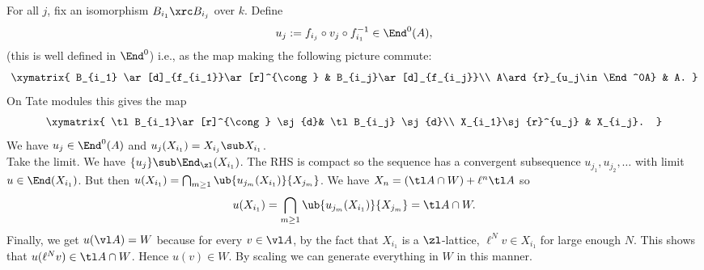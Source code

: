 For all $j$, fix an isomorphism $B_{i_1}\xrc B_{i_j}$ over $k$.
Define 
\[
u_j:=f_{i_j}\circ v_j \circ f_{i_1}^{-1}\in \End^0(A),
\]
(this is well defined in $\End^0$) 
i.e., as the map making the following picture commute:
%
\[
\xymatrix{
B_{i_1} \ar[d]_{f_{i_1}}\ar[r]^{\cong} & B_{i_j}\ar[d]_{f_{i_j}}\\
A\ard{r}_{u_j\in \End^0A} & A.
}
\]
On Tate modules this gives the map
\[
\xymatrix{
\tl B_{i_1}\ar[r]^{\cong} \sj{d}& \tl B_{i_j} \sj{d}\\
X_{i_1}\sj{r}^{u_j} & X_{i_j}.
}
\]
We have $u_j\in \End^0(A)$ and $u_j(X_{i_1})=X_{i_j}\sub X_{i_1}$.\\

 Take the limit. We have $\{u_j\}\sub \End_{\zl} (X_{i_1})$. The RHS is compact so the sequence has a convergent subsequence $u_{j_1}, u_{j_2},\ldots$ with limit $u\in \End(X_{i_1})$. But then $u(X_{i_1})=\bigcap_{m\ge 1} \ub{u_{j_m} (X_{i_1})}{X_{j_m}}$. We have $X_n=(\tl A\cap W)+\ell^n\tl A$ so 
\[
u(X_{i_1})=\bigcap_{m\ge 1} \ub{u_{j_m} (X_{i_1})}{X_{j_m}}=\tl A\cap W.
\]
Finally, we get $u(\vl A)=W$ because for every $v\in \vl A$, by the fact that $X_{i_1}$ is a $\zl$-lattice, $\ell^N v\in X_{i_1}$ for large enough $N$.
This shows that $u(\ell^Nv)\in \tl A\cap W$. Hence $u(v)\in W$. By scaling we can generate everything in $W$ in this manner. 

